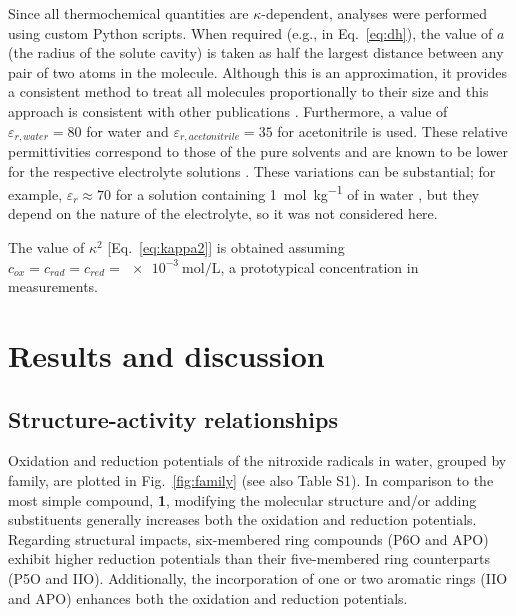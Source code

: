 \documentclass[review,preprint]{elsarticle}
\begin{document}
Since all thermochemical quantities are $\kappa$-dependent, analyses were performed using custom Python scripts. When required (e.g., in Eq.~\eqref{eq:dh}), the value of $a$ (the radius of the solute cavity) is taken as half the largest distance between any pair of two atoms in the molecule. Although this is an approximation, it provides a consistent method to treat all molecules proportionally to their size and this approach is consistent with other publications \cite{matsuiDensityFunctionalTheory2013}.  Furthermore, a value of $\varepsilon_{r,water}=80$ for water and $\varepsilon_{r,acetonitrile}=35$ for acetonitrile is used. These relative permittivities correspond to those of the pure solvents and are known to be lower for the respective electrolyte solutions \cite{silvaTrueHuckelEquation2022}. These variations can be substantial; for example, $\varepsilon_r \approx 70$ for a solution containing \SI{1}{\mol\per\kilo\gram} of  in water \cite{kontogeorgisDebyeHuckelTheoryIts2018, silvaTrueHuckelEquation2022}, but they depend on the nature of the electrolyte, so it was not considered here.

The value of $\kappa^2$  [Eq.~\eqref{eq:kappa2}] is obtained assuming  $c_{ox} = c_{rad} = c_ {red} = \SI{e-3}{\mole\per\liter}$, a prototypical concentration in measurements.


\section{Results and discussion} \label{sec:results}

\subsection{Structure-activity relationships} \label{sec:sar}

Oxidation and reduction potentials of the nitroxide radicals in water, grouped by family, are plotted in Fig.~\ref{fig:family} (see also Table S1). In comparison to the most simple compound, \textbf{1}, modifying the molecular structure and/or adding substituents generally increases both the oxidation and reduction potentials. Regarding structural impacts, six-membered ring compounds (P6O and APO) exhibit higher reduction potentials than their five-membered ring counterparts (P5O and IIO). Additionally, the incorporation of one or two aromatic rings (IIO and APO) enhances both the oxidation and reduction potentials.
\end{document}
